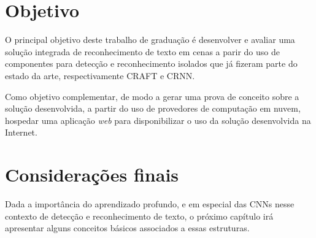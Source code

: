 \section{Objetivo}

O principal objetivo deste trabalho de graduação é desenvolver e avaliar uma solução integrada de reconhecimento de texto em cenas a parir do uso de 
componentes para detecção e reconhecimento isolados que já fizeram parte do estado da arte, respectivamente CRAFT e CRNN.

Como objetivo complementar, de modo a gerar uma prova de conceito sobre a solução desenvolvida, a partir do uso de provedores de computação em nuvem, 
hospedar uma aplicação \textit{web} para disponibilizar o uso da solução desenvolvida na Internet.

\section{Considerações finais}
Dada a importância do aprendizado profundo, e em especial das CNNs nesse contexto de detecção e reconhecimento de texto, o próximo capítulo irá 
apresentar alguns conceitos básicos associados a essas estruturas.